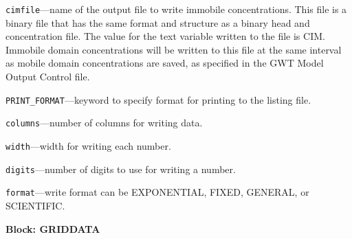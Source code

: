 \begin{description}
\item \texttt{cimfile}---name of the output file to write immobile concentrations.  This file is a binary file that has the same format and structure as a binary head and concentration file.  The value for the text variable written to the file is CIM.  Immobile domain concentrations will be written to this file at the same interval as mobile domain concentrations are saved, as specified in the GWT Model Output Control file.

\item \texttt{PRINT\_FORMAT}---keyword to specify format for printing to the listing file.

\item \texttt{columns}---number of columns for writing data.

\item \texttt{width}---width for writing each number.

\item \texttt{digits}---number of digits to use for writing a number.

\item \texttt{format}---write format can be EXPONENTIAL, FIXED, GENERAL, or SCIENTIFIC.

\end{description}
\item \textbf{Block: GRIDDATA}

